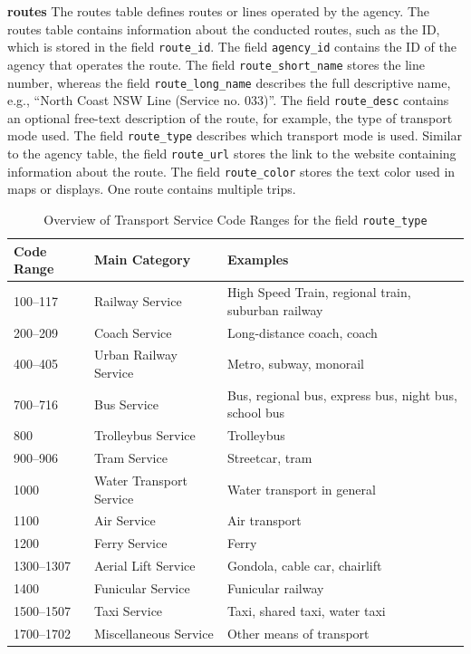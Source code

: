 \par\medskip
\noindent\textbf{routes} \quad
The routes table defines routes or lines operated by the agency. The routes table contains information about the conducted routes, such as the ID, which is stored in the field \texttt{route\_id}. The field \texttt{agency\_id} contains the ID of the agency that operates the route. The field \texttt{route\_short\_name} stores the line number, whereas the field \texttt{route\_long\_name} describes the full descriptive name, e.g., \enquote{North Coast NSW Line (Service no. 033)}. The field \texttt{route\_desc} contains an optional free-text description of the route, for example, the type of transport mode used. The field \texttt{route\_type} describes which transport mode is used. Similar to the agency table, the field \texttt{route\_url} stores the link to the website containing information about the route. The field \texttt{route\_color} stores the text color used in maps or displays. One route contains multiple trips. \begin{table}[htbp]


\centering
\caption{Overview of Transport Service Code Ranges for the field \texttt{route\_type}}
\label{tab:transport-service-codes}
\begin{tabular}{lll}
\hline
\textbf{Code Range} & \textbf{Main Category} & \textbf{Examples} \\
\hline
100--117   & Railway Service          & High Speed Train, regional train, suburban railway \\
200--209   & Coach Service            & Long-distance coach, coach \\
400--405   & Urban Railway Service    & Metro, subway, monorail \\
700--716   & Bus Service              & Bus, regional bus, express bus, night bus, school bus \\
800        & Trolleybus Service       & Trolleybus \\
900--906   & Tram Service             & Streetcar, tram \\
1000       & Water Transport Service  & Water transport in general \\
1100       & Air Service              & Air transport \\
1200       & Ferry Service            & Ferry \\
1300--1307 & Aerial Lift Service      & Gondola, cable car, chairlift \\
1400       & Funicular Service        & Funicular railway \\
1500--1507 & Taxi Service             & Taxi, shared taxi, water taxi \\
1700--1702 & Miscellaneous Service    & Other means of transport \\
\hline
\end{tabular}
\end{table}

